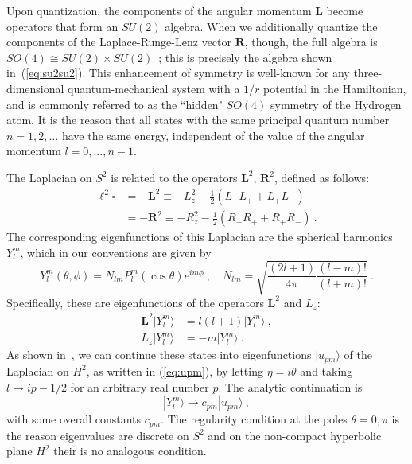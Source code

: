 \documentclass[12pt]{article}
\begin{document}
Upon quantization, the components of the angular momentum $\mathbf{L}$ become operators that form an $SU(2)$ algebra.  When we additionally quantize the components of the Laplace-Runge-Lenz vector $\mathbf{R}$, though, the full algebra is $SO(4) \cong SU(2) \times SU(2)$~\cite{refId0}; this is precisely the algebra shown in~(\ref{eq:su2su2}).  This enhancement of symmetry is well-known for any three-dimensional quantum-mechanical system with a $1/r$ potential in the Hamiltonian, and is commonly referred to as the ``hidden" $SO(4)$ symmetry of the Hydrogen atom. It is the reason that all states with the same principal quantum number $n=1,2,\ldots$ have the same energy, independent of the value of the angular momentum $l=0,\ldots, n-1$. 

The Laplacian on $S^2$ is related to the operators $\mathbf{L}^2$, $\mathbf{R}^2$, defined as follows:
\begin{equation}\begin{aligned}
	\ell^2 \square &= -\mathbf{L}^2 \equiv - L_z^2 - \frac{1}{2}\left(L_{-} L_{+} + L_{+} L_{-}\right) \\
	&= -\mathbf{R}^2 \equiv -R_z^2 - \frac{1}{2}\left(R_{-} R_{+} + R_{+} R_{-}\right)~.
\end{aligned}\end{equation}
The corresponding eigenfunctions of this Laplacian are the spherical harmonics $Y_l^m$, which in our conventions are given by
\begin{equation}
	Y_l^m(\theta,\phi) = N_{lm} P_l^m(\cos\theta) e^{im\phi}~, \quad N_{lm} = \sqrt{\frac{(2l+1)}{4\pi} \frac{(l-m)!}{(l+m)!}}~.
\end{equation}
Specifically, these are eigenfunctions of the operators $\mathbf{L}^2$ and $L_z$:
\begin{equation}\begin{aligned}
	\mathbf{L}^2 |Y_l^m\rangle &= l(l+1)|Y_l^m\rangle~, \\
	L_z |Y_l^m\rangle &= -m |Y_l^m\rangle~.
\end{aligned}\end{equation}
As shown in~\cite{Camporesi:1994ga}, we can continue these states into eigenfunctions $|u_{pm}\rangle$ of the Laplacian on $H^2$, as written in (\ref{eq:upm}), by letting $\eta = i \theta$ and taking $l \to i p - 1/2$ for an arbitrary real number $p$.  The analytic continuation is
\begin{equation}
	|Y_l^m\rangle \to c_{pm}|u_{pm}\rangle~,
\label{eq:yumap}
\end{equation}
with some overall constants $c_{pm}$. The regularity condition at the poles $\theta=0,\pi$ is the reason eigenvalues are discrete on $S^2$ and on the non-compact hyperbolic plane $H^2$ their is no analogous condition. 
\end{document}

